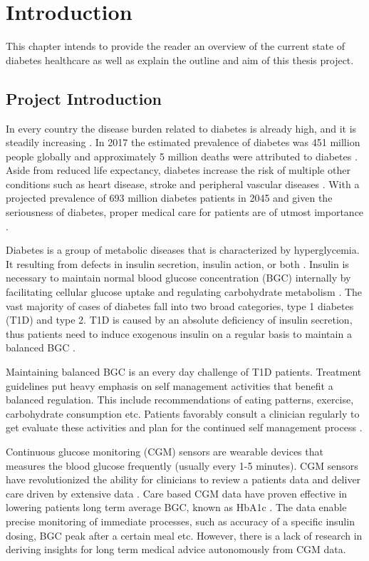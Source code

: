 \chapter{Introduction}

This chapter intends to provide the reader an overview of the current state of diabetes healthcare as well as explain the outline and aim of this thesis project.

\section{Project Introduction}

In every country the disease burden related to diabetes is already high, and it is steadily increasing \parencite{Forouhi2014}.
In 2017 the estimated prevalence of diabetes was 451 million people globally and approximately 5 million deaths were attributed to diabetes \parencite{Cho2018}.
Aside from reduced life expectancy, diabetes increase the risk of multiple other conditions such as heart disease, stroke and peripheral vascular diseases \parencite{Forouhi2014}.
With a projected prevalence of 693 million diabetes patients in 2045 and given the seriousness of diabetes, proper medical care for patients are of utmost importance \parencite{Cho2018}.

Diabetes is a group of metabolic diseases that is characterized by hyperglycemia.
It resulting from defects in insulin secretion, insulin action, or both \parencite{ADA2010}.
Insulin is necessary to maintain normal blood glucose concentration (BGC) internally by facilitating cellular glucose uptake and regulating carbohydrate metabolism \parencite{Wilcox2005}.
The vast majority of cases of diabetes fall into two broad categories, type 1 diabetes (T1D) and type 2.
T1D is caused by an absolute deficiency of insulin secretion, thus patients need to induce exogenous insulin on a regular basis to maintain a balanced BGC \parencite{ADA2010}.

Maintaining balanced BGC is an every day challenge of T1D patients.
Treatment guidelines put heavy emphasis on self management activities that benefit a balanced regulation.
This include recommendations of eating patterns, exercise, carbohydrate consumption etc.
Patients favorably consult a clinician regularly to get evaluate these activities and plan for the continued self management process \parencite{Cooke2013}.

Continuous glucose monitoring (CGM) sensors are wearable devices that measures the blood glucose frequently (usually every 1-5 minutes).
CGM sensors have revolutionized the ability for clinicians to review a patients data and deliver care driven by extensive data \parencite{Facchinetti2016}.
Care based CGM data have proven effective in lowering patients long term average BGC, known as HbA1c \parencite{dungan2018monitoring}.
The data enable precise monitoring of immediate processes, such as accuracy of a specific insulin dosing, BGC peak after a certain meal etc.
However, there is a lack of research in deriving insights for long term medical advice autonomously from CGM data.

